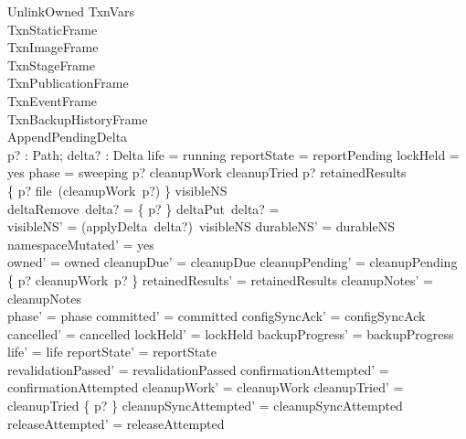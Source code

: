 \documentclass{article}
\begin{document}
\begin{schema}{UnlinkOwned}
	\Delta TxnVars \\
	TxnStaticFrame \\
	TxnImageFrame \\
	TxnStageFrame \\
	TxnPublicationFrame \\
	TxnEventFrame \\
	TxnBackupHistoryFrame \\
	AppendPendingDelta \\
	p? : Path; delta? : Delta
	\where
	life = running \land reportState = reportPending \land lockHeld = yes \land
	phase = sweeping \land p? \in \dom cleanupWork \setminus cleanupTried \land
	p? \notin \dom retainedResults \\
	\{ p? \mapsto file~(cleanupWork~p?) \} \subseteq visibleNS \\
	deltaRemove~delta? = \{ p? \} \land deltaPut~delta? = \emptyset \\
	visibleNS' = (applyDelta~delta?)~visibleNS \land durableNS' = durableNS \land
	namespaceMutated' = yes \\
	owned' = owned \land cleanupDue' = cleanupDue \land
	cleanupPending' = cleanupPending \oplus \{ p? \mapsto cleanupWork~p? \} \land
	retainedResults' = retainedResults \land cleanupNotes' = cleanupNotes \\
	phase' = phase \land committed' = committed \land
	configSyncAck' = configSyncAck \land cancelled' = cancelled \land
	lockHeld' = lockHeld \land backupProgress' = backupProgress \land
	life' = life \land reportState' = reportState \\
	revalidationPassed' = revalidationPassed \land
	confirmationAttempted' = confirmationAttempted \land
	cleanupWork' = cleanupWork \land cleanupTried' = cleanupTried \cup \{ p? \} \land
	cleanupSyncAttempted' = cleanupSyncAttempted \land releaseAttempted' = releaseAttempted
\end{schema}
\end{document}
